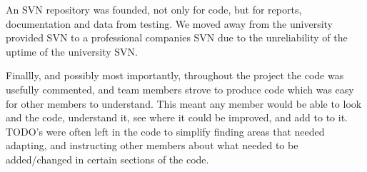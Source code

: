 An SVN repository was founded, not only for code, but for reports, documentation and data from testing. We moved away from the university provided SVN to a professional companies SVN due to the unreliability of the uptime of the university SVN.\linebreak 

Finallly, and possibly most importantly, throughout the project the code was usefully commented, and team members strove to produce code which was easy for other members to understand. This meant any member would be able to look and the code, understand it, see where it could be improved, and add to to it. TODO's were often left in the code to simplify finding areas that needed adapting, and instructing other members about what needed to be added/changed in certain sections of the code.
